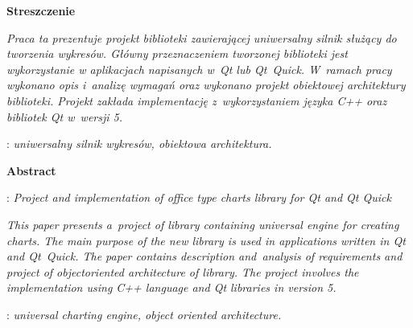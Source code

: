 \begin{titlepage}
    \newpage\thispagestyle{empty}
    \vspace*{2\baselineskip}
    \begin{center}
	{\large\bfseries Streszczenie}\par\bigskip
    \end{center}

    {\itshape
    Praca ta prezentuje projekt biblioteki zawierającej uniwersalny silnik służący do tworzenia wykresów. Główny przeznaczeniem tworzonej biblioteki jest wykorzystanie w aplikacjach napisanych w~Qt lub Qt~Quick.
	W~ramach pracy wykonano opis i~analizę wymagań oraz wykonano projekt obiektowej architektury biblioteki. Projekt zakłada implementację z~wykorzystaniem języka C++ oraz bibliotek Qt w~wersji 5.
	}
    \vspace*{1\baselineskip}

    : {\itshape uniwersalny silnik wykresów, obiektowa architektura.}
    \par
    \vspace{4\baselineskip}
    \begin{center}
	{\large\bfseries Abstract}\par\bigskip
    \end{center}
    : {\itshape Project and implementation of office type charts library for Qt and Qt Quick}\par
    \vspace*{1\baselineskip}
    {\itshape
    This paper presents a~project of library containing universal engine for creating charts. The main purpose of the new library is used in applications written in Qt and Qt~Quick.
The paper contains description and~analysis of requirements and project of object ​​oriented architecture of library. The project involves the implementation using C++ language and Qt libraries in version 5.}
    \vspace*{1\baselineskip}

    : {\itshape universal charting engine, object oriented architecture.}

\end{titlepage}

